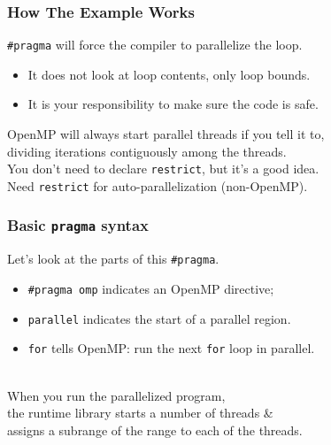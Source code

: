 \begin{frame}[containsverbatim]
  \frametitle{How The Example Works}

\large
  
    \verb+#pragma+ will force the compiler to parallelize the loop.

  \begin{itemize}
    \item It does not look at loop contents, only loop bounds.
    \item \alert{It is your responsibility to make sure the code is safe.}
  \end{itemize}
  OpenMP will always start parallel threads if you tell it to,\\
  dividing iterations contiguously among the threads.\\[1em]

  You don't need to declare {\tt restrict}, but it's a good idea.\\
  Need {\tt restrict} for auto-parallelization (non-OpenMP).
  

\end{frame}

\begin{frame}[containsverbatim]
  \frametitle{Basic {\tt pragma} syntax}

\begin{changemargin}{1cm}
\large
  Let's look at the parts of this \verb+#pragma+.\\[1em]

  \begin{itemize}
    \item \verb+#pragma omp+ indicates an OpenMP directive;
    \vfill
    \item {\tt parallel} indicates the start of a parallel region.
    \vfill
    \item {\tt for} tells OpenMP: run the next {\tt for} loop in parallel.
  \end{itemize}
  ~\\[-1em]

  When you run the parallelized program, \\ the runtime library starts
  a number of threads \& \\  assigns a subrange of the range to 
  each of the threads.
\end{changemargin}

\end{frame}

